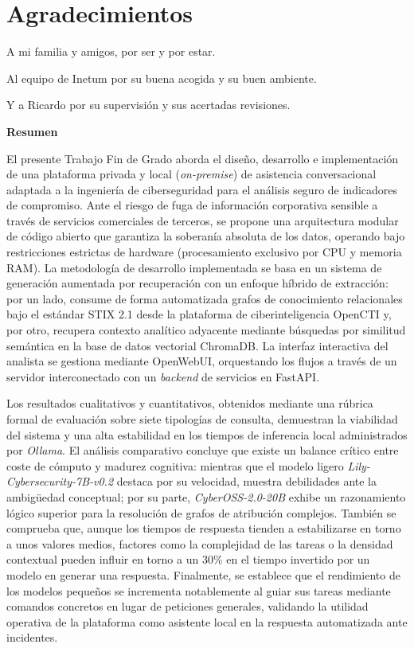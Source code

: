 \documentclass[12pt]{report}
\begin{document}
    
\newpage
\section*{Agradecimientos}
A mi familia y amigos, por ser y por estar.

Al equipo de Inetum por su buena acogida y su buen ambiente.

Y a Ricardo por su supervisión y sus acertadas revisiones.
\setcounter{page}{1}

\newpage
\begin{center}
	\textbf{Resumen}
\end{center}
	\noindent El presente Trabajo Fin de Grado aborda el diseño, desarrollo e implementación de una plataforma privada y local (\textit{on-premise}) de asistencia conversacional adaptada a la ingeniería de ciberseguridad para el análisis seguro de indicadores de compromiso. Ante el riesgo de fuga de información corporativa sensible a través de servicios comerciales de terceros, se propone una arquitectura modular de código abierto que garantiza la soberanía absoluta de los datos, operando bajo restricciones estrictas de hardware (procesamiento exclusivo por CPU y memoria RAM). La metodología de desarrollo implementada se basa en un sistema de generación aumentada por recuperación con un enfoque híbrido de extracción: por un lado, consume de forma automatizada grafos de conocimiento relacionales bajo el estándar STIX 2.1 desde la plataforma de ciberinteligencia OpenCTI y, por otro, recupera contexto analítico adyacente mediante búsquedas por similitud semántica en la base de datos vectorial ChromaDB. La interfaz interactiva del analista se gestiona mediante OpenWebUI, orquestando los flujos a través de un servidor interconectado con un \textit{backend} de servicios en FastAPI.
	
	Los resultados cualitativos y cuantitativos, obtenidos mediante una rúbrica formal de evaluación sobre siete tipologías de consulta, demuestran la viabilidad del sistema y una alta estabilidad en los tiempos de inferencia local administrados por \textit{Ollama}. El análisis comparativo concluye que existe un balance crítico entre coste de cómputo y madurez cognitiva: mientras que el modelo ligero \textit{Lily-Cybersecurity-7B-v0.2} destaca por su velocidad, muestra debilidades ante la ambigüedad conceptual; por su parte, \textit{CyberOSS-2.0-20B} exhibe un razonamiento lógico superior para la resolución de grafos de atribución complejos. También se comprueba que, aunque los tiempos de respuesta tienden a estabilizarse en torno a unos valores medios, factores como la complejidad de las tareas o la densidad contextual pueden influir en torno a un 30\% en el tiempo invertido por un modelo en generar una respuesta. Finalmente, se establece que el rendimiento de los modelos pequeños se incrementa notablemente al guiar sus tareas mediante comandos concretos en lugar de peticiones generales, validando la utilidad operativa de la plataforma como asistente local en la respuesta automatizada ante incidentes.
\vspace{1.5em}
\end{document}

